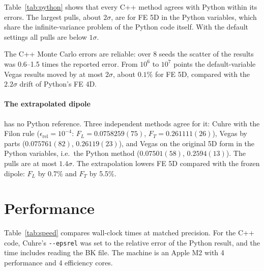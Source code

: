 \documentclass[11pt,a4paper]{article}
\newcommand{\opt}[1]{\texttt{-{}-#1}}
\begin{document}
Table~\ref{tab:python} shows that every C++ method agrees with Python within
its errors. The largest pulls, about $2\sigma$, are for FE 5D in the Python
variables, which share the infinite-variance problem of the Python code itself.
With the default settings all pulls are below $1\sigma$.

The C++ Monte Carlo errors are reliable: over 8 seeds the scatter of the
results was 0.6--1.5 times the reported error. From $10^6$ to $10^7$ points the
default-variable Vegas results moved by at most $2\sigma$, about $0.1\%$ for FE
5D, compared with the $2.2\sigma$ drift of Python's FE 4D.

\paragraph{The extrapolated dipole} has no Python reference. Three independent
methods agree for it: Cuhre with the Filon rule ($\epsilon_{\text{rel}} =
10^{-4}$: $F_L = 0.0758259(75)$, $F_T = 0.261111(26)$), Vegas by parts
($0.075761(82)$, $0.26119(23)$), and Vegas on the original 5D form in the Python
variables, i.e.\ the Python method ($0.07501(58)$, $0.2594(13)$). The pulls are
at most $1.4\sigma$. The extrapolation lowers FE 5D compared with the frozen
dipole: $F_L$ by 0.7\% and $F_T$ by 5.5\%.

\section{Performance}

Table~\ref{tab:speed} compares wall-clock times at matched precision. For the
C++ code, Cuhre's \opt{epsrel} was set to the relative error of the Python
result, and the time includes reading the BK file. The machine is an Apple M2
with 4 performance and 4 efficiency cores.
\end{document}
